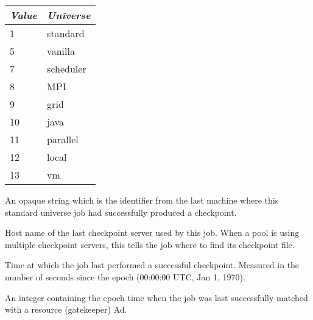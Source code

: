 \begin{description}
\begin{center}
\begin{table}[hbt]
\begin{tabular}{|p{2cm}p{3cm}|} \hline
\emph{Value} & \emph{Universe} \\ \hline \hline
1 & standard \\ \hline
5 & vanilla \\ \hline
7 & scheduler \\ \hline
8 & MPI \\ \hline
9 & grid \\ \hline
10 & java \\ \hline
11 & parallel \\ \hline
12 & local \\ \hline
13 & vm \\ \hline
\end{tabular}
\end{table}
\end{center}

\item[\AdAttr{LastCheckpointPlatform}:]  An opaque string which is the
 identifier from the last machine where this
standard universe job had successfully produced a checkpoint.

\item[\AdAttr{LastCkptServer}:]  Host name of the last checkpoint
server used by this job.  When a pool is using multiple checkpoint
servers, this tells the job where to find its checkpoint file.

\item[\AdAttr{LastCkptTime}:]  Time at which the job last performed a
successful checkpoint.  Measured in the number of seconds since the
epoch (00:00:00 UTC, Jan 1, 1970).

\item[\AdAttr{LastMatchTime}:]  An integer containing the epoch time
when the job was last successfully matched with a resource (gatekeeper) Ad.


\end{description}
